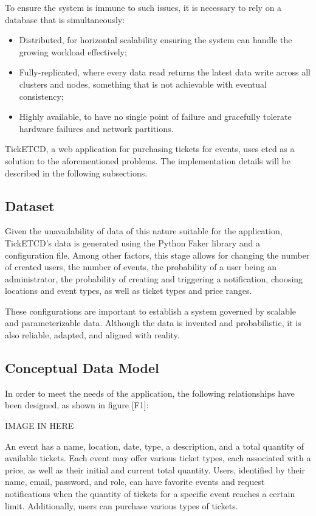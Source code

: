 \documentclass[screen,review]{acmart}
\begin{document}
To ensure the system is immune to such issues, it is necessary to rely on a database that is simultaneously:

\begin{itemize}
    \item Distributed, for horizontal scalability ensuring the system can handle the growing workload effectively;
    \item Fully-replicated, where every data read returns the latest data write across all clusters and nodes, something that is not achievable with eventual consistency;
    \item Highly available, to have no single point of failure and gracefully tolerate hardware failures and network partitions.
\end{itemize}

TickETCD, a web application for purchasing tickets for events, uses etcd as a solution to the aforementioned problems. The implementation details will be described in the following subsections.

\subsection{Dataset}
Given the unavailability of data of this nature suitable for the application, TickETCD's data is generated using the Python Faker library and a configuration file. Among other factors, this stage allows for changing the number of created users, the number of events, the probability of a user being an administrator, the probability of creating and triggering a notification, choosing locations and event types, as well as ticket types and price ranges.

These configurations are important to establish a system governed by scalable and parameterizable data. Although the data is invented and probabilistic, it is also reliable, adapted, and aligned with reality.

\subsection{Conceptual Data Model}
In order to meet the needs of the application, the following relationships have been designed, as shown in figure [F1]:

IMAGE IN HERE

An event has a name, location, date, type, a description, and a total quantity of available tickets. Each event may offer various ticket types, each associated with a price, as well as their initial and current total quantity. Users, identified by their name, email, password, and role, can have favorite events and request notifications when the quantity of tickets for a specific event reaches a certain limit. Additionally, users can purchase various types of tickets.
\end{document}
